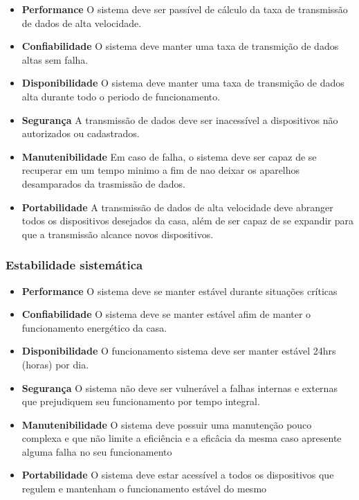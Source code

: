 \begin{itemize}

	\item \textbf{Performance}
	O sistema deve ser passível de cálculo da taxa de transmissão de dados de alta velocidade.

	\item \textbf{Confiabilidade}
	O sistema deve manter uma taxa de transmição de dados altas sem falha.

	\item \textbf{Disponibilidade}
	O sistema deve manter uma taxa de transmição de dados alta durante todo o periodo de funcionamento.

	\item \textbf{Segurança}
	A transmissão de dados deve ser inacessível a dispositivos não autorizados ou cadastrados.

	\item \textbf{Manutenibilidade}
	Em caso de falha, o sistema deve ser capaz de se recuperar em um tempo minimo a fim de nao deixar os aparelhos desamparados da trasmissão de dados.

	\item \textbf{Portabilidade}
	A transmissão de dados de alta velocidade deve abranger todos os dispositivos desejados da casa, além de ser capaz de se expandir para que a transmissão alcance novos dispositivos.

\end{itemize}

\subsubsection{Estabilidade sistemática}
\begin{itemize}

	\item \textbf{Performance}
	O sistema deve se manter estável durante situações críticas

	\item \textbf{Confiabilidade}
	O sistema deve se manter estável afim de manter o funcionamento energético da casa.

	\item \textbf{Disponibilidade}
	O funcionamento sistema deve ser manter estável 24hrs (horas) por dia.

	\item \textbf{Segurança}
	O sistema não deve ser vulnerável a falhas internas e externas que prejudiquem seu funcionamento por tempo integral.

	\item \textbf{Manutenibilidade}
	O sistema deve possuir uma manutenção pouco complexa e que não limite a eficiência e a eficâcia da mesma caso apresente alguma falha no seu funcionamento

	\item \textbf{Portabilidade}
	O sistema deve estar acessível a todos os dispositivos que regulem e mantenham o funcionamento estável do mesmo

\end{itemize}

